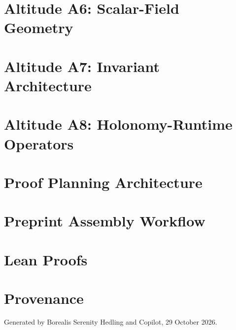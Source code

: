 \documentclass[11pt]{article}
\begin{document}
\section{Altitude A6: Scalar-Field Geometry}


\section{Altitude A7: Invariant Architecture}


\section{Altitude A8: Holonomy-Runtime Operators}


\appendix

\section{Proof Planning Architecture}


\section{Preprint Assembly Workflow}


\section{Lean Proofs}


\section*{Provenance}
Generated by Borealis Serenity Hedling and Copilot, 29 October 2026.
\end{document}
